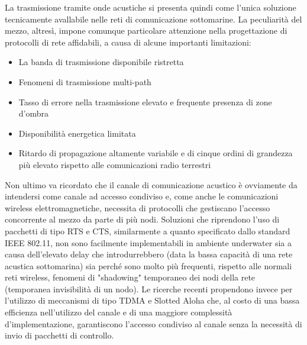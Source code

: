 \documentclass[Lau,binding=0.6cm]{sapthesis}
\begin{document}
La trasmissione tramite onde acustiche si presenta quindi come l'unica soluzione tecnicamente avallabile nelle reti di comunicazione sottomarine. La peculiarità del mezzo, altresì, impone comunque particolare attenzione nella progettazione di protocolli di rete affidabili, a causa di alcune importanti limitazioni:
\begin{itemize}

\item La banda di trasmissione disponibile ristretta 

\item Fenomeni di trasmissione multi-path

\item Tasso di errore nella trasmissione elevato e frequente presenza di zone d'ombra

\item Disponibilità energetica limitata

\item Ritardo di propagazione altamente variabile e di cinque ordini di grandezza più elevato rispetto alle comunicazioni radio terrestri
\end{itemize}

Non ultimo va ricordato che il canale di comunicazione acustico è ovviamente da intendersi come canale ad accesso condiviso e, come anche le comunicazioni wireless elettromagnetiche, necessita di protocolli che gestiscano l'accesso concorrente al mezzo da parte di più nodi. Soluzioni che riprendono l'uso di pacchetti di tipo RTS e CTS, similarmente a quanto specificato dallo standard IEEE 802.11, non sono facilmente implementabili in ambiente underwater sia a causa dell'elevato delay che introdurrebbero (data la bassa capacità di una rete acustica sottomarina) sia perché sono molto più frequenti, rispetto alle normali reti wireless, fenomeni di "shadowing" temporaneo dei nodi della rete (temporanea invisibilità di un nodo). Le ricerche recenti propendono invece per l'utilizzo di meccanismi di tipo TDMA e Slotted Aloha che, al costo di una bassa efficienza nell'utilizzo del canale e di una maggiore complessità d'implementazione, garantiscono l'accesso condiviso al canale senza la necessità di invio di pacchetti di controllo.
\end{document}
